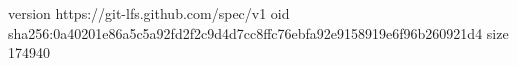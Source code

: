 version https://git-lfs.github.com/spec/v1
oid sha256:0a40201e86a5c5a92fd2f2c9d4d7cc8ffc76ebfa92e9158919e6f96b260921d4
size 174940
